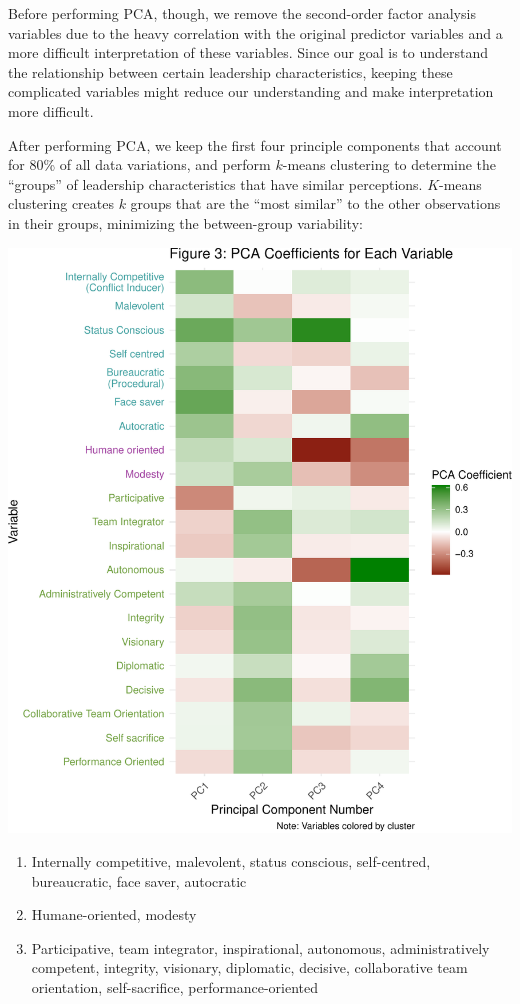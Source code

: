 \documentclass[
]{article}
\providecommand{\tightlist}{%
  \setlength{\itemsep}{0pt}\setlength{\parskip}{0pt}}
\begin{document}
Before performing PCA, though, we remove the second-order factor
analysis variables due to the heavy correlation with the original
predictor variables and a more difficult interpretation of these
variables. Since our goal is to understand the relationship between
certain leadership characteristics, keeping these complicated variables
might reduce our understanding and make interpretation more difficult.

After performing PCA, we keep the first four principle components that
account for 80\% of all data variations, and perform \(k\)-means
clustering to determine the ``groups'' of leadership characteristics
that have similar perceptions. \(K\)-means clustering creates \(k\)
groups that are the ``most similar'' to the other observations in their
groups, minimizing the between-group variability:

\begin{center}\includegraphics[width=0.85\linewidth]{globe_report_files/figure-latex/pca_heatmap-1} \end{center}


\begin{enumerate}
\def\labelenumi{\arabic{enumi}.}
\tightlist
\item
  \textcolor{clust1}{Internally competitive, malevolent, status conscious, self-centred, bureaucratic, face saver, autocratic}
\item
  \textcolor{clust2}{Humane-oriented, modesty}
\item
  \textcolor{clust3}{Participative, team integrator, inspirational, autonomous, administratively competent, integrity, visionary, diplomatic, decisive, collaborative team orientation, self-sacrifice, performance-oriented}
\end{enumerate}
\end{document}
